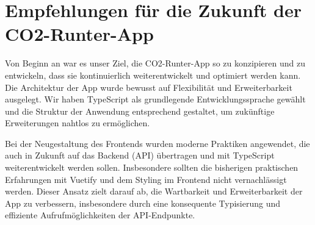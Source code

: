 \section{Empfehlungen für die Zukunft der CO2-Runter-App}

Von Beginn an war es unser Ziel, die CO2-Runter-App so zu konzipieren und zu entwickeln, dass sie kontinuierlich weiterentwickelt und optimiert werden kann. Die Architektur der App wurde bewusst auf Flexibilität und Erweiterbarkeit ausgelegt. Wir haben TypeScript als grundlegende Entwicklungssprache gewählt und die Struktur der Anwendung entsprechend gestaltet, um zukünftige Erweiterungen nahtlos zu ermöglichen.

Bei der Neugestaltung des Frontends wurden moderne Praktiken angewendet, die auch in Zukunft auf das Backend (\acs{API}) übertragen und mit TypeScript weiterentwickelt werden sollen. Insbesondere sollten die bisherigen praktischen Erfahrungen mit Vuetify und dem Styling im Frontend nicht vernachlässigt werden. Dieser Ansatz zielt darauf ab, die Wartbarkeit und Erweiterbarkeit der App zu verbessern, insbesondere durch eine konsequente Typisierung und effiziente Aufrufmöglichkeiten der \acs{API}-Endpunkte.

